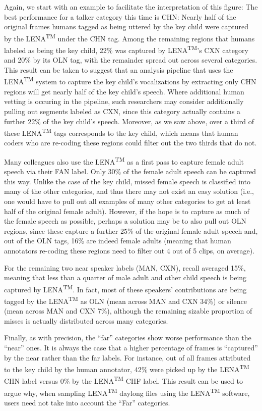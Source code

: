 \documentclass[english,floatsintext,man]{apa6}
\begin{document}
Again, we start with an example to facilitate the interpretation of this
figure: The best performance for a talker category this time is CHN:
Nearly half of the original frames humans tagged as being uttered by the
key child were captured by the LENA\textsuperscript{TM} under the CHN
tag. Among the remaining regions that humans labeled as being the key
child, 22\% was captured by LENA\textsuperscript{TM}'s CXN category and
20\% by its OLN tag, with the remainder spread out across several
categories. This result can be taken to suggest that an analysis
pipeline that uses the LENA\textsuperscript{TM} system to capture the
key child's vocalizations by extracting only CHN regions will get nearly
half of the key child's speech. Where additional human vetting is
occuring in the pipeline, such researchers may consider additionally
pulling out segments labeled as CXN, since this category actually
contains a further 22\% of the key child's speech. Moreover, as we saw
above, over a third of these LENA\textsuperscript{TM} tags corresponds
to the key child, which means that human coders who are re-coding these
regions could filter out the two thirds that do not.

Many colleagues also use the LENA\textsuperscript{TM} as a first pass to
capture female adult speech via their FAN label. Only 30\% of the female
adult speech can be captured this way. Unlike the case of the key child,
missed female speech is classified into many of the other categories,
and thus there may not exist an easy solution (i.e., one would have to
pull out all examples of many other categories to get at least half of
the original female adult). However, if the hope is to capture as much
of the female speech as possible, perhaps a solution may be to also pull
out OLN regions, since these capture a further 25\% of the original
female adult speech and, out of the OLN tags, 16\% are indeed female
adults (meaning that human annotators re-coding these regions need to
filter out 4 out of 5 clips, on average).

For the remaining two near speaker labels (MAN, CXN), recall averaged
15\%, meaning that less than a quarter of male adult and other child
speech is being captured by LENA\textsuperscript{TM}. In fact, most of
these speakers' contributions are being tagged by the
LENA\textsuperscript{TM} as OLN (mean across MAN and CXN 34\%) or
silence (mean across MAN and CXN 7\%), although the remaining sizable
proportion of misses is actually distributed across many categories.

Finally, as with precision, the \enquote{far} categories show worse
performance than the \enquote{near} ones. It is always the case that a
higher percentage of frames is \enquote{captured} by the near rather
than the far labels. For instance, out of all frames attributed to the
key child by the human annotator, 42\% were picked up by the
LENA\textsuperscript{TM} CHN label versus 0\% by the
LENA\textsuperscript{TM} CHF label. This result can be used to argue
why, when sampling LENA\textsuperscript{TM} daylong files using the
LENA\textsuperscript{TM} software, users need not take into account the
\enquote{Far} categories.
\end{document}
